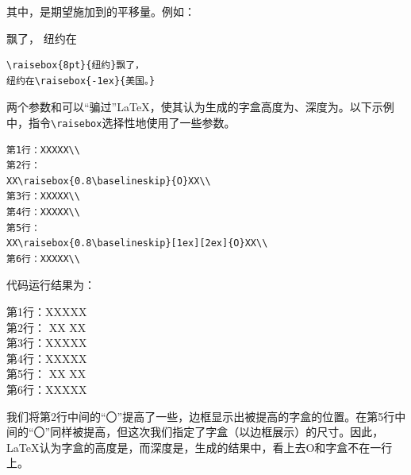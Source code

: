 其中，是期望施加到的平移量。例如：

\begin{codelist}[4.12]{
飘了，
纽约在
}
\begin{verbatim}
\raisebox{8pt}{纽约}飘了，
纽约在\raisebox{-1ex}{美国。}\end{verbatim}
\end{codelist}

两个参数和可以``骗过''\LaTeX ，使其认为生成的字盒高度为、深度为。以下示例中，指令\verb|\raisebox|选择性地使用了一些参数。

\begin{dmd}
  \begin{verbatim}
第1行：XXXXX\\
第2行：
XX\raisebox{0.8\baselineskip}{O}XX\\
第3行：XXXXX\\
第4行：XXXXX\\
第5行：
XX\raisebox{0.8\baselineskip}[1ex][2ex]{O}XX\\ 
第6行：XXXXX\\
  \end{verbatim}
\end{dmd}

代码运行结果为：

\newcommand{\blob}{\makebox[\tmplength]{O}}

\begin{flushleft}
  第1行：XXXXX\\
  第2行：
  XX\hspace{-\fboxrule}%
  \fbox{\raisebox{0.8\baselineskip}{\blob}}%
  \hspace{-\fboxrule}XX \\
  第3行：XXXXX\\
  第4行：XXXXX\\
  第5行：
  XX\hspace{-\fboxrule}%
  \fbox{\raisebox{0.8\baselineskip}[1ex][2ex]{\blob}}%
  \hspace{-\fboxrule}XX \\
  第6行：XXXXX\\
\end{flushleft}

我们将第2行中间的``〇''提高了一些，边框显示出被提高的字盒的位置。在第5行中间的``〇''同样被提高，但这次我们指定了字盒（以边框展示）的尺寸。因此，\LaTeX 认为字盒的高度是\dm{1ex}，而深度是\dm{2ex}，生成的结果中，看上去O和字盒不在一行上。


